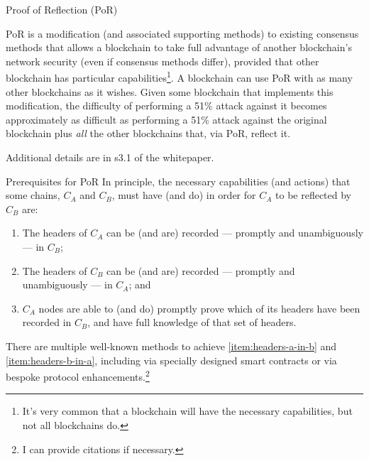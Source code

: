 
\begin{section}{Proof of Reflection (PoR)}

 PoR is a modification (and associated supporting methods) to existing consensus methods that allows a blockchain to take full advantage of another blockchain's network security (even if consensus methods differ), provided that other blockchain has particular capabilities\footnote{It's very common that a blockchain will have the necessary capabilities, but not all blockchains do.}. A blockchain can use PoR with as many other blockchains as it wishes. Given some blockchain that implements this modification, the difficulty of performing a 51\% attack against it becomes approximately as difficult as performing a 51\% attack against the original blockchain plus \emph{all} the other blockchains that, via PoR, reflect it.

 Additional details are in s3.1 of the whitepaper.

 \begin{subsection}{Prerequisites for PoR}
     In principle, the necessary capabilities (and actions) that some chains,
     \(C_A\) and \(C_B\), must have (and do) in order for \(C_A\) to be
     reflected by \(C_B\) are:

     \begin{enumerate}
         \def\labelenumi{\arabic{enumi}.}
         \tightlist
         \item \label{item:headers-a-in-b}
               The headers of \(C_A\) can be (and are) recorded --- promptly and unambiguously --- in \(C_B\);
         \item \label{item:headers-b-in-a}
               The headers of \(C_B\) can be (and are) recorded --- promptly and unambiguously --- in \(C_A\); and
         \item \label{item:prove-headers}
               \(C_A\) nodes are able to (and do) promptly prove which of its headers have been recorded in \(C_B\), and have full knowledge of that set of headers.
     \end{enumerate}

     There are multiple well-known methods to achieve \autoref{item:headers-a-in-b} and \autoref{item:headers-b-in-a}, including via specially designed smart contracts or via bespoke protocol enhancements.\footnote{I can provide citations if necessary.}


\end{subsection}
\end{section}
